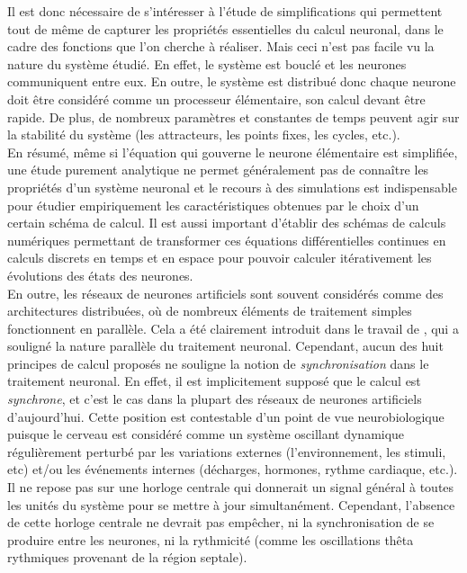 Il est donc nécessaire de s'intéresser à l'étude de simplifications qui permettent tout de même de capturer les propriétés essentielles du calcul neuronal, dans le cadre des fonctions que l'on cherche à réaliser. Mais ceci n'est pas facile vu la nature du système étudié. En effet, le système est bouclé et les neurones communiquent entre eux. En outre, le système est distribué donc chaque neurone doit être considéré comme un processeur élémentaire, son calcul devant être rapide. De plus, de nombreux paramètres et constantes de temps peuvent agir sur la stabilité du système (les attracteurs, les points fixes, les cycles, etc.).\\

En résumé, même si l'équation qui gouverne le neurone élémentaire est simplifiée, une étude purement analytique ne permet généralement pas de conna\^itre les propriétés d'un système neuronal et le recours à des simulations est indispensable pour étudier empiriquement les caractéristiques obtenues par le choix d'un certain schéma de calcul. Il est aussi important d'établir des schémas de calculs numériques permettant de transformer ces équations différentielles continues en calculs discrets en temps et en espace pour pouvoir calculer itérativement les évolutions des états des neurones.\\%

En outre, les réseaux de neurones artificiels sont souvent considérés comme des architectures distribuées, où de nombreux éléments de traitement simples fonctionnent en parallèle. Cela a été clairement introduit dans le travail de \cite {Rumelhart:1987}, qui a souligné la nature parallèle du traitement neuronal. Cependant, aucun des huit principes de calcul proposés ne souligne la notion de \textit{synchronisation} dans le traitement neuronal. En effet, il est implicitement supposé que le calcul est \textit{synchrone}, et c'est le cas dans la plupart des réseaux de neurones artificiels d'aujourd'hui. Cette position est contestable d'un point de vue neurobiologique puisque le cerveau est considéré comme un système oscillant dynamique régulièrement perturbé par les variations externes (l'environnement, les stimuli, etc) et/ou les événements internes (décharges, hormones, rythme cardiaque, etc.). Il ne repose pas sur une horloge centrale qui donnerait un signal général à toutes les unités du système pour se mettre à jour simultanément. Cependant, l'absence de cette horloge centrale ne devrait pas empêcher, ni la synchronisation de se produire entre les neurones, ni la rythmicité (comme les oscillations thêta rythmiques provenant de la région septale).\\ 

